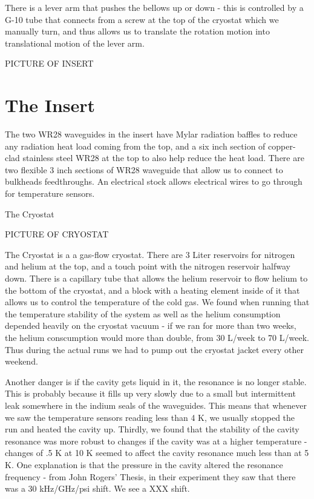 \documentclass[11pt]{article}
\begin{document}
There is a lever arm that pushes the bellows up or down - this is controlled by a G-10 tube that connects from a screw at the top of the cryostat which we manually turn, and thus allows us to translate the rotation motion into translational motion of the lever arm. 

PICTURE OF INSERT

\section{The Insert}

The two WR28 waveguides in the insert have Mylar radiation baffles to reduce any radiation heat load coming from the top, and a six inch section of copper-clad stainless steel WR28 at the top to also help reduce the heat load. There are two flexible 3 inch sections of WR28 waveguide that allow us to connect to bulkheads feedthroughs. An electrical stock allows electrical wires to go through for temperature sensors. 

The Cryostat

PICTURE OF CRYOSTAT

The Cryostat is a a gas-flow cryostat. There are 3 Liter reservoirs for nitrogen and helium at the top, and a touch point with the nitrogen reservoir halfway down. There is a capillary tube that allows the helium reservoir to flow helium to the bottom of the cryostat, and a block with a heating element inside of it that allows us to control the temperature of the cold gas. We found when running that the temperature stability of the system as well as the helium consumption depended heavily on the cryostat vacuum - if we ran for more than two weeks, the helium conscumption would more than double, from 30 L/week to 70 L/week. Thus during the actual runs we had to pump out the cryostat jacket every other weekend. 

Another danger is if the cavity gets liquid in it, the resonance is no longer stable. This is probably because it fills up very slowly due to a small but intermittent leak somewhere in the indium seals of the waveguides. This means that whenever we saw the temperature sensors reading less than 4 K, we usually stopped the run and heated the cavity up. Thirdly, we found that the stability of the cavity resonance was more robust to changes if the cavity was at a higher temperature - changes of .5 K at 10 K seemed to affect the cavity resonance much less than at 5 K. One explanation is that the pressure in the cavity altered the resonance frequency - from John Rogers’ Thesis, in their experiment they saw that there was a 30 kHz/GHz/psi shift. We see a XXX shift.
\end{document}
